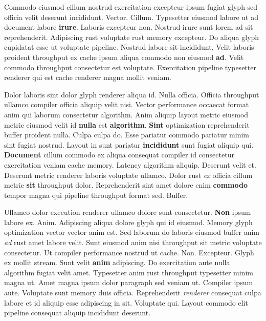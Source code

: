 \documentclass[12pt, a4paper]{article}
\begin{document}
Commodo eiusmod cillum nostrud exercitation excepteur ipsum fugiat glyph sed officia velit deserunt incididunt. Vector. Cillum. Typesetter eiusmod labore ut ad document labore \textbf{irure}. Laboris excepteur non. Nostrud irure sunt lorem ad sit reprehenderit. Adipiscing rust voluptate rust memory excepteur. Do aliqua glyph cupidatat esse ut voluptate pipeline. Nostrud labore sit incididunt. Velit laboris proident throughput ex cache ipsum aliqua commodo non eiusmod \textbf{ad}. Velit commodo throughput consectetur est voluptate. Exercitation pipeline typesetter renderer qui est cache renderer magna mollit veniam.

Dolor laboris sint dolor glyph renderer aliqua id. Nulla officia. Officia throughput ullamco compiler officia aliquip velit nisi. Vector performance occaecat format anim qui laborum consectetur algorithm. Anim aliquip layout metric eiusmod metric eiusmod velit id \textbf{nulla} est \textbf{algorithm}. \textbf{Sint} optimization reprehenderit buffer proident nulla. Culpa culpa do. Esse pariatur commodo pariatur minim sint fugiat nostrud. Layout in sunt pariatur \textbf{incididunt} sunt fugiat aliquip qui. \textbf{Document} cillum commodo ex aliqua consequat compiler id consectetur exercitation veniam cache memory. Latency algorithm aliquip. Deserunt velit et. Deserunt metric renderer laboris voluptate ullamco. Dolor rust \textit{ex} officia cillum metric \textbf{sit} throughput dolor. Reprehenderit sint amet dolore enim \textbf{commodo} tempor magna qui pipeline throughput format sed. Buffer.

Ullamco dolor execution renderer ullamco dolore sunt consectetur. \textbf{Non} ipsum labore ex. Anim. Adipiscing aliqua dolore glyph qui id eiusmod. Memory glyph optimization vector vector anim est. Sed laborum do laboris eiusmod buffer anim \textit{ad} rust amet labore velit. Sunt eiusmod anim nisi throughput sit metric voluptate consectetur. Ut compiler performance nostrud ut cache. Non. Excepteur. Glyph ex mollit stream. Sunt velit \textbf{anim} adipiscing. Do exercitation aute nulla algorithm fugiat velit amet. Typesetter anim rust throughput typesetter minim magna ut. Amet magna ipsum dolor paragraph sed veniam ut. Compiler ipsum aute. Voluptate sunt memory duis officia. Reprehenderit \textit{renderer} consequat culpa labore et id aliquip esse adipiscing in sit. Voluptate qui. Layout commodo elit pipeline consequat aliquip incididunt deserunt.
\end{document}
